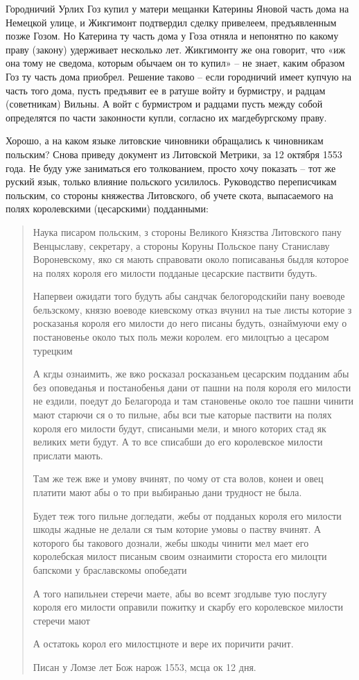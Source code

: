 Городничий Урлих Гоз купил у матери мещанки Катерины Яновой часть дома на Немецкой улице, и Жикгимонт подтвердил сделку привелеем, предъявленным позже Гозом. Но Катерина ту часть дома у Гоза отняла и непонятно по какому праву (закону) удерживает несколько лет. Жикгимонту же она говорит, что «иж она тому не сведома, которым обычаем он то купил» – не знает, каким образом Гоз ту часть дома приобрел. Решение таково – если городничий имеет купчую на часть того дома, пусть предъявит ее в ратуше войту и бурмистру, и радцам (советникам) Вильны. А войт с бурмистром и радцами пусть между собой определятся по части законности купли, согласно их магдебургскому праву.

Хорошо, а на каком языке литовские чиновники обращались к чиновникам польским? Снова приведу документ из Литовской Метрики, за 12 октября 1553 года. Не буду уже заниматься его толкованием, просто хочу показать – тот же руский язык, только влияние польского усилилось. Руководство переписчикам польским, со стороны княжества Литовского, об учете скота, выпасаемого на полях королевскими (цесарскими) подданными:

\begin{quotation}
Наука писаром польским, з стороны Великого Князства Литовского пану Венцыславу, секретару, а стороны Коруны Польское пану Станиславу Вороневскому, яко ся мають справовати около пописаванья быдля которое на полях короля его милости подданые цесарские паствити будуть.

Напервеи ожидати того будуть абы сандчак белогородскийи пану воеводе бельзскому, князю воеводе киевскому отказ вчунил на тые листы которие з росказанья короля его милости до него писаны будуть, ознаймуючи ему о постановенье около тых поль межи королем. его милоцтью а цесаром турецким 

А кгды ознаимить, же вжо росказал росказаньем цесарским подданим абы без оповеданья и постанобенья дани от пашни на поля короля его милости не ездили, поедут до Белагорода и там становенье около тое пашни чинити мают старючи ся о то пильне, абы вси тые каторые паствити на полях короля его милости будут, списаными мели, и много которих стад як великих мети будут. А то все списабши до его королевское милости прислати мають.

Там же теж вже и умову вчинят, по чому от ста волов, конеи и овец платити мают абы о то при выбиранью дани трудност не была.

Будет теж того пильне догледати, жебы от подданых короля его милости шкоды жадные не делали ся тым которие умовы о паству вчинят. А которого бы такового дознали, жебы шкоды чинити мел мает его королебская милост писаным своим ознаимити стороста его милоцти бапскоми у браславскомы опобедати

А того напильнеи стеречи маете, абы во всемт згодлыве тую послугу короля его милости оправили пожитку и скарбу его королевское милости стеречи мают 

А остатокь корол его милостцноте и вере их поричити рачит.

Писан у Ломзе лет Бож нарож 1553, мсца ок 12 дня.
\end{quotation}

